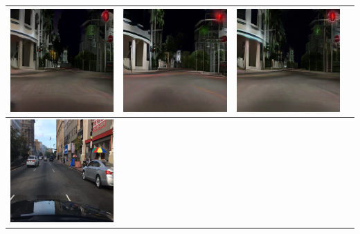 \documentclass{VUMIFPSbakalaurinis}
\begin{document}
\begin{table}[H]
{\begin{tabular}{|c|c|c|c|}
            \includegraphics[scale=0.35]{img/pvz/5_cycle} & \includegraphics[scale=0.35]{img/pvz/5_cut} & \includegraphics[scale=0.35]{img/pvz/5_mspc}
            \\
            \hline
            \includegraphics[scale=0.35]{img/pvz/6_real} & 

\end{tabular}}
\end{table}
\end{document}

